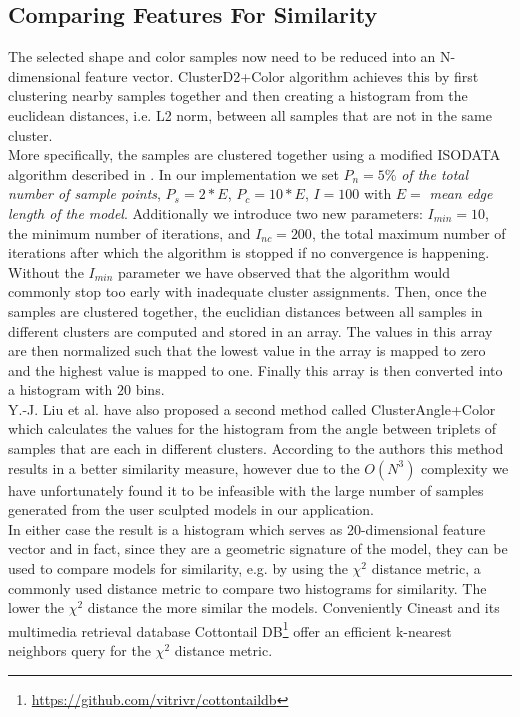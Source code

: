 \subsection{Comparing Features For Similarity}

The selected shape and color samples now need to be reduced into an N-dimensional feature vector. ClusterD2+Color algorithm achieves this by first clustering nearby samples together and then
creating a histogram from the euclidean distances, i.e. L2 norm, between all samples that are not in the same cluster.\\
More specifically, the samples are clustered together using a modified
ISODATA algorithm described in \cite{cluster_d2_color}. In our implementation we set $P_n = 5\%$ \textit{of the total number of sample points}, $P_s = 2 * E$, $P_c = 10 * E$, $I = 100$ with $E =$ \textit{mean edge length of the model}.
Additionally we introduce two new parameters: $I_{min} = 10$, the minimum number of iterations, and $I_{nc} = 200$, the total maximum number of iterations after which the algorithm is stopped if no convergence is happening. Without
the $I_{min}$ parameter we have observed that the algorithm would commonly stop too early with inadequate cluster assignments. Then, once the samples are clustered together, the euclidian distances between all samples in different clusters
are computed and stored in an array. The values in this array are then normalized such that the lowest value in the array is mapped to zero and the highest value is mapped to one. Finally this array is then converted into a histogram with $20$ bins.\\
Y.-J. Liu et al. \cite{cluster_d2_color} have also proposed a second method called ClusterAngle+Color which calculates the values for the histogram from the angle between triplets of samples that are each in different clusters. According
to the authors this method results in a better similarity measure, however due to the $O(N^3)$ complexity we have unfortunately found it to be infeasible with the large number of samples generated from the user sculpted models in our application.\\
In either case the result is a histogram which serves as 20-dimensional feature vector and in fact, since they are a geometric signature of the model, they can be used to compare models for similarity,
e.g. by using the $\chi^2$ distance metric, a commonly used distance metric to compare two histograms for similarity. The lower the $\chi^2$ distance the more similar the models. Conveniently Cineast and its multimedia retrieval
database Cottontail DB\footnote{\url{https://github.com/vitrivr/cottontaildb}} offer an efficient k-nearest neighbors query for the $\chi^2$ distance metric.\\

